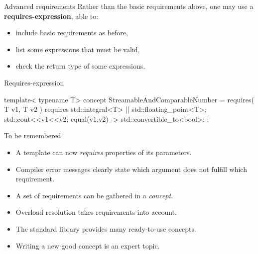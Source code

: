 \begin{frame}[fragile]
    \begin{block}{Advanced requirements}
        Rather than the basic requirements above, one may use a \textbf{requires-expression}, able to:
        \begin{itemize}
            \item include basic requirements as before,
            \item list some expressions that must be valid,
            \item check the return type of some expressions.
        \end{itemize}
    \end{block}
    \begin{exampleblock}{Requires-expression}
      \scriptsize
      \begin{cppcode*}{}
      template< typename T>
      concept StreamableAndComparableNumber = requires( T v1, T v2 )
       {
        requires std::integral<T> || std::floating_point<T>;
        std::cout<<v1<<v2;
        { equal(v1,v2) } -> std::convertible_to<bool>;
       };
      \end{cppcode*}
    \end{exampleblock}
\end{frame}

\begin{frame}[fragile]
    \begin{block}{To be remembered}
      \begin{itemize}
      \item A template can now {\it requires} properties of its parameters.
      \item Compiler error messages clearly state which argument does not fulfill which requirement.
      \item A set of requirements can be gathered in a {\it concept}.
      \item Overload resolution takes requirements into account.
      \item The standard library provides many ready-to-use concepts.
      \item Writing a new good concept is an expert topic.
      \end{itemize}
    \end{block}
\end{frame}
